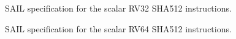 \begin{figure}[h]

\caption{SAIL specification for the scalar RV32 SHA512 instructions.}
\label{fig:sail:sha512:rv32}
\end{figure}

\begin{figure}[h]

\caption{SAIL specification for the scalar RV64 SHA512 instructions.}
\label{fig:sail:sha512:rv64}
\end{figure}
